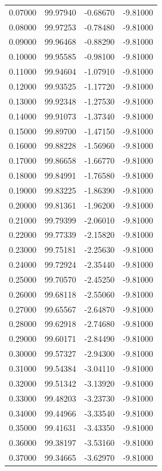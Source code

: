 \begin{table}
\begin{tabular}{llll}
0.07000 & 99.97940 & -0.68670 & -9.81000 \\
0.08000 & 99.97253 & -0.78480 & -9.81000 \\
0.09000 & 99.96468 & -0.88290 & -9.81000 \\
0.10000 & 99.95585 & -0.98100 & -9.81000 \\
0.11000 & 99.94604 & -1.07910 & -9.81000 \\
0.12000 & 99.93525 & -1.17720 & -9.81000 \\
0.13000 & 99.92348 & -1.27530 & -9.81000 \\
0.14000 & 99.91073 & -1.37340 & -9.81000 \\
0.15000 & 99.89700 & -1.47150 & -9.81000 \\
0.16000 & 99.88228 & -1.56960 & -9.81000 \\
0.17000 & 99.86658 & -1.66770 & -9.81000 \\
0.18000 & 99.84991 & -1.76580 & -9.81000 \\
0.19000 & 99.83225 & -1.86390 & -9.81000 \\
0.20000 & 99.81361 & -1.96200 & -9.81000 \\
0.21000 & 99.79399 & -2.06010 & -9.81000 \\
0.22000 & 99.77339 & -2.15820 & -9.81000 \\
0.23000 & 99.75181 & -2.25630 & -9.81000 \\
0.24000 & 99.72924 & -2.35440 & -9.81000 \\
0.25000 & 99.70570 & -2.45250 & -9.81000 \\
0.26000 & 99.68118 & -2.55060 & -9.81000 \\
0.27000 & 99.65567 & -2.64870 & -9.81000 \\
0.28000 & 99.62918 & -2.74680 & -9.81000 \\
0.29000 & 99.60171 & -2.84490 & -9.81000 \\
0.30000 & 99.57327 & -2.94300 & -9.81000 \\
0.31000 & 99.54384 & -3.04110 & -9.81000 \\
0.32000 & 99.51342 & -3.13920 & -9.81000 \\
0.33000 & 99.48203 & -3.23730 & -9.81000 \\
0.34000 & 99.44966 & -3.33540 & -9.81000 \\
0.35000 & 99.41631 & -3.43350 & -9.81000 \\
0.36000 & 99.38197 & -3.53160 & -9.81000 \\
0.37000 & 99.34665 & -3.62970 & -9.81000 \\

\end{tabular}
\end{table}
